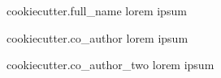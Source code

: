 \begin{IEEEbiographynophoto}{ {{cookiecutter.full_name}} }
lorem ipsum
\end{IEEEbiographynophoto}

\begin{IEEEbiographynophoto}{ {{ cookiecutter.co_author }} }
lorem ipsum
\end{IEEEbiographynophoto}

\begin{IEEEbiographynophoto}{ {{ cookiecutter.co_author_two }} }
lorem ipsum
\end{IEEEbiographynophoto}
